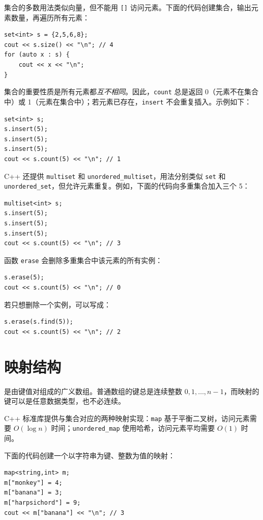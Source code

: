 集合的多数用法类似向量，但不能用 \texttt{[]} 访问元素。下面的代码创建集合，输出元素数量，再遍历所有元素：
\begin{lstlisting}
set<int> s = {2,5,6,8};
cout << s.size() << "\n"; // 4
for (auto x : s) {
    cout << x << "\n";
}
\end{lstlisting}

集合的重要性质是所有元素都\emph{互不相同}。因此，\texttt{count} 总是返回 0（元素不在集合中）或 1（元素在集合中）；若元素已存在，\texttt{insert} 不会重复插入。示例如下：

\begin{lstlisting}
set<int> s;
s.insert(5);
s.insert(5);
s.insert(5);
cout << s.count(5) << "\n"; // 1
\end{lstlisting}

C++ 还提供 \texttt{multiset} 和 \texttt{unordered\_multiset}，用法分别类似 \texttt{set} 和 \texttt{unordered\_set}，但允许元素重复。例如，下面的代码向多重集合加入三个 5：

\begin{lstlisting}
multiset<int> s;
s.insert(5);
s.insert(5);
s.insert(5);
cout << s.count(5) << "\n"; // 3
\end{lstlisting}
函数 \texttt{erase} 会删除多重集合中该元素的所有实例：
\begin{lstlisting}
s.erase(5);
cout << s.count(5) << "\n"; // 0
\end{lstlisting}
若只想删除一个实例，可以写成：
\begin{lstlisting}
s.erase(s.find(5));
cout << s.count(5) << "\n"; // 2
\end{lstlisting}

\section{映射结构}


是由键值对组成的广义数组。普通数组的键总是连续整数 $0,1,\ldots,n-1$，而映射的键可以是任意数据类型，也不必连续。

C++ 标准库提供与集合对应的两种映射实现：\texttt{map} 基于平衡二叉树，访问元素需要 $O(\log n)$ 时间；\texttt{unordered\_map} 使用哈希，访问元素平均需要 $O(1)$ 时间。

下面的代码创建一个以字符串为键、整数为值的映射：

\begin{lstlisting}
map<string,int> m;
m["monkey"] = 4;
m["banana"] = 3;
m["harpsichord"] = 9;
cout << m["banana"] << "\n"; // 3
\end{lstlisting}

